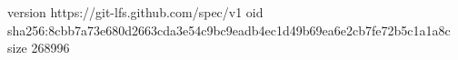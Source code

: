 version https://git-lfs.github.com/spec/v1
oid sha256:8cbb7a73e680d2663cda3e54c9bc9eadb4ec1d49b69ea6e2cb7fe72b5c1a1a8c
size 268996
